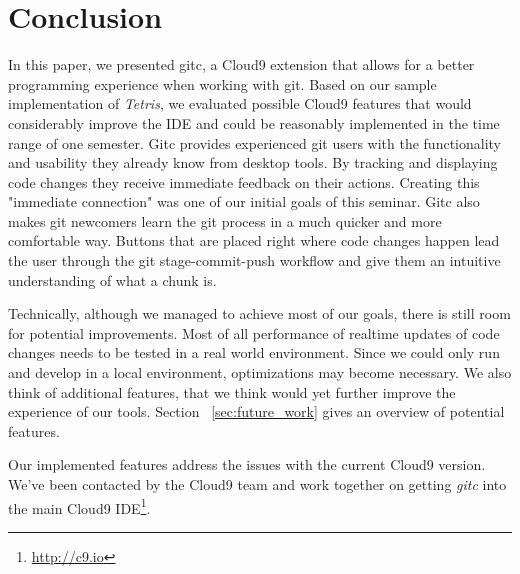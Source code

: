 \section{Conclusion}
\label{sec:Conclusion}

In this paper, we presented gitc, a Cloud9 extension that allows for a better programming experience when working with git. 
Based on our sample implementation of \textit{Tetris}, we evaluated possible Cloud9 features that would considerably improve the IDE and could be reasonably implemented in the time range of one semester.
Gitc provides experienced git users with the functionality and usability they already know from desktop tools. 
By tracking and displaying code changes they receive immediate feedback on their actions. 
Creating this "immediate connection" was one of our initial goals of this seminar. 
Gitc also makes git newcomers learn the git process in a much quicker and more comfortable way. Buttons that are placed right where code changes happen lead the user through the git stage-commit-push workflow and give them an intuitive understanding of what a chunk is.

Technically, although we managed to achieve most of our goals, there is still room for potential improvements. 
Most of all performance of realtime updates of code changes needs to be tested in a real world environment. 
Since we could only run and develop in a local environment, optimizations may become necessary. 
We also think of additional features, that we think would yet further improve the experience of our tools. 
Section ~\ref{sec:future_work} gives an overview of potential features.

Our implemented features address the issues with the current Cloud9 version. 
We've been contacted by the Cloud9 team and work together on getting \emph{gitc} into the main Cloud9 IDE\footnote{\url{http://c9.io}}.